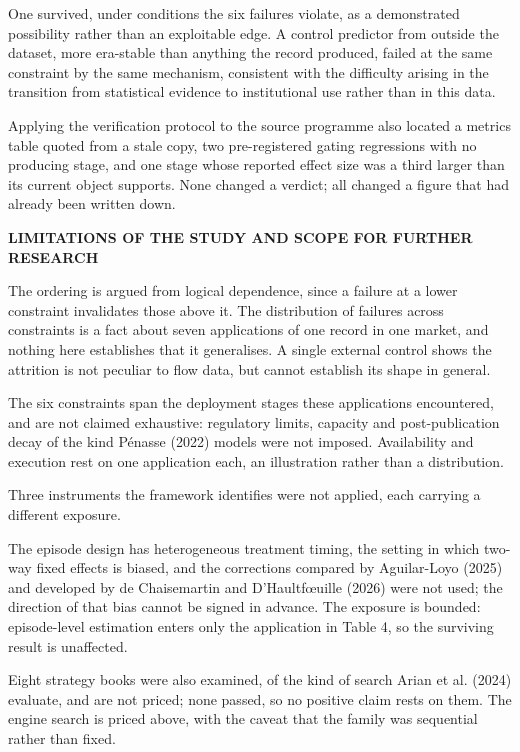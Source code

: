 \documentclass[12pt,a4paper]{article}
\newcommand{\mainhead}[1]{%
  \par\vspace{10pt}\noindent\textbf{\MakeUppercase{#1}}\par\vspace{2pt}}
\begin{document}
One survived, under conditions the six failures violate, as a demonstrated possibility rather than an exploitable edge. A control predictor from outside the dataset, more era-stable than anything the record produced, failed at the same constraint by the same mechanism, consistent with the difficulty arising in the transition from statistical evidence to institutional use rather than in this data.

Applying the verification protocol to the source programme also located a metrics table quoted from a stale copy, two pre-registered gating regressions with no producing stage, and one stage whose reported effect size was a third larger than its current object supports. None changed a verdict; all changed a figure that had already been written down.

\mainhead{LIMITATIONS OF THE STUDY AND SCOPE FOR FURTHER RESEARCH}

The ordering is argued from logical dependence, since a failure at a lower constraint invalidates those above it. The distribution of failures across constraints is a fact about seven applications of one record in one market, and nothing here establishes that it generalises. A single external control shows the attrition is not peculiar to flow data, but cannot establish its shape in general.

The six constraints span the deployment stages these applications encountered, and are not claimed exhaustive: regulatory limits, capacity and post-publication decay of the kind Pénasse (2022) models were not imposed. Availability and execution rest on one application each, an illustration rather than a distribution.

Three instruments the framework identifies were not applied, each carrying a different exposure.

The episode design has heterogeneous treatment timing, the setting in which two-way fixed effects is biased, and the corrections compared by Aguilar-Loyo (2025) and developed by de Chaisemartin and D'Haultfœuille (2026) were not used; the direction of that bias cannot be signed in advance. The exposure is bounded: episode-level estimation enters only the application in Table 4, so the surviving result is unaffected.

Eight strategy books were also examined, of the kind of search Arian et al. (2024) evaluate, and are not priced; none passed, so no positive claim rests on them. The engine search is priced above, with the caveat that the family was sequential rather than fixed.
\end{document}
